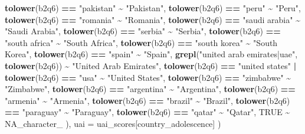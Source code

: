 \documentclass[
]{article}
\newenvironment{Shaded}{\begin{snugshade}}{\end{snugshade}}
\newcommand{\AttributeTok}[1]{\textcolor[rgb]{0.13,0.29,0.53}{#1}}
\newcommand{\ConstantTok}[1]{\textcolor[rgb]{0.56,0.35,0.01}{#1}}
\newcommand{\FunctionTok}[1]{\textcolor[rgb]{0.13,0.29,0.53}{\textbf{#1}}}
\newcommand{\NormalTok}[1]{#1}
\newcommand{\SpecialCharTok}[1]{\textcolor[rgb]{0.81,0.36,0.00}{\textbf{#1}}}
\newcommand{\StringTok}[1]{\textcolor[rgb]{0.31,0.60,0.02}{#1}}
\begin{document}
\begin{Shaded}
\begin{Highlighting}[]
      \FunctionTok{tolower}\NormalTok{(b2q6) }\SpecialCharTok{==} \StringTok{"pakistan"}        \SpecialCharTok{\textasciitilde{}} \StringTok{"Pakistan"}\NormalTok{,}
      \FunctionTok{tolower}\NormalTok{(b2q6) }\SpecialCharTok{==} \StringTok{"peru"}            \SpecialCharTok{\textasciitilde{}} \StringTok{"Peru"}\NormalTok{,}
      \FunctionTok{tolower}\NormalTok{(b2q6) }\SpecialCharTok{==} \StringTok{"romania"}         \SpecialCharTok{\textasciitilde{}} \StringTok{"Romania"}\NormalTok{,}
      \FunctionTok{tolower}\NormalTok{(b2q6) }\SpecialCharTok{==} \StringTok{"saudi arabia"}    \SpecialCharTok{\textasciitilde{}} \StringTok{"Saudi Arabia"}\NormalTok{,}
      \FunctionTok{tolower}\NormalTok{(b2q6) }\SpecialCharTok{==} \StringTok{"serbia"}          \SpecialCharTok{\textasciitilde{}} \StringTok{"Serbia"}\NormalTok{,}
      \FunctionTok{tolower}\NormalTok{(b2q6) }\SpecialCharTok{==} \StringTok{"south africa"}    \SpecialCharTok{\textasciitilde{}} \StringTok{"South Africa"}\NormalTok{,}
      \FunctionTok{tolower}\NormalTok{(b2q6) }\SpecialCharTok{==} \StringTok{"south korea"}     \SpecialCharTok{\textasciitilde{}} \StringTok{"South Korea"}\NormalTok{,}
      \FunctionTok{tolower}\NormalTok{(b2q6) }\SpecialCharTok{==} \StringTok{"spain"}           \SpecialCharTok{\textasciitilde{}} \StringTok{"Spain"}\NormalTok{,}
      \FunctionTok{grepl}\NormalTok{(}\StringTok{"united arab emirates|uae"}\NormalTok{, }\FunctionTok{tolower}\NormalTok{(b2q6)) }\SpecialCharTok{\textasciitilde{}} \StringTok{"United Arab Emirates"}\NormalTok{,}
      \FunctionTok{tolower}\NormalTok{(b2q6) }\SpecialCharTok{==} \StringTok{"united states"} \SpecialCharTok{|} \FunctionTok{tolower}\NormalTok{(b2q6) }\SpecialCharTok{==} \StringTok{"usa"} \SpecialCharTok{\textasciitilde{}} \StringTok{"United States"}\NormalTok{,}
      \FunctionTok{tolower}\NormalTok{(b2q6) }\SpecialCharTok{==} \StringTok{"zimbabwe"}        \SpecialCharTok{\textasciitilde{}} \StringTok{"Zimbabwe"}\NormalTok{,}
      \FunctionTok{tolower}\NormalTok{(b2q6) }\SpecialCharTok{==} \StringTok{"argentina"}       \SpecialCharTok{\textasciitilde{}} \StringTok{"Argentina"}\NormalTok{,}
      \FunctionTok{tolower}\NormalTok{(b2q6) }\SpecialCharTok{==} \StringTok{"armenia"}         \SpecialCharTok{\textasciitilde{}} \StringTok{"Armenia"}\NormalTok{,}
      \FunctionTok{tolower}\NormalTok{(b2q6) }\SpecialCharTok{==} \StringTok{"brazil"}          \SpecialCharTok{\textasciitilde{}} \StringTok{"Brazil"}\NormalTok{,}
      \FunctionTok{tolower}\NormalTok{(b2q6) }\SpecialCharTok{==} \StringTok{"paraguay"}        \SpecialCharTok{\textasciitilde{}} \StringTok{"Paraguay"}\NormalTok{,}
      \FunctionTok{tolower}\NormalTok{(b2q6) }\SpecialCharTok{==} \StringTok{"qatar"}           \SpecialCharTok{\textasciitilde{}} \StringTok{"Qatar"}\NormalTok{,}
      \ConstantTok{TRUE} \SpecialCharTok{\textasciitilde{}} \ConstantTok{NA\_character\_}
\NormalTok{    ),}
    \AttributeTok{uai =}\NormalTok{ uai\_scores[country\_adolescence]}
\NormalTok{  )}


\end{Highlighting}
\end{Shaded}
\end{document}
